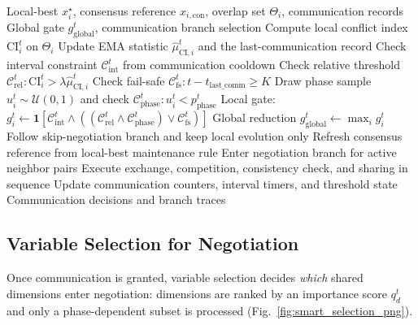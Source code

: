 \documentclass[conference]{IEEEtran}
\begin{document}
\begin{algorithm}[t]
  \footnotesize
  \caption{Conflict-Gated Communication with Phase Sampling (Abstract)}
  \label{alg:ci_gating}
  \begin{algorithmic}[1]
  \Require Local-best $x_i^\star$, consensus reference $x_{i,\mathrm{con}}$, overlap set $\Theta_i$, communication records
  \Ensure Global gate $g_{\mathrm{global}}^t$, communication branch selection
    \State Compute local conflict index $\mathrm{CI}_i^t$ on $\Theta_i$
    \State Update EMA statistic $\hat{\mu}_{\mathrm{CI},i}^t$ and the last-communication record
    \State Check interval constraint $\mathcal{C}_{\mathrm{int}}^t$ from communication cooldown
    \State Check relative threshold $\mathcal{C}_{\mathrm{rel}}^t: \mathrm{CI}_i^t > \lambda\hat{\mu}_{\mathrm{CI},i}^t$
    \State Check fail-safe $\mathcal{C}_{\mathrm{fs}}^t: t-t_{\mathrm{last\_comm}}\ge K$
    \State Draw phase sample $u_i^t\sim\mathcal{U}(0,1)$ and check $\mathcal{C}_{\mathrm{phase}}^t: u_i^t<p_{\mathrm{phase}}^t$
    \State Local gate:
    \Statex \hspace{1.5em}$g_i^t\gets \mathbf{1}\left[\mathcal{C}_{\mathrm{int}}^t\land((\mathcal{C}_{\mathrm{rel}}^t\land \mathcal{C}_{\mathrm{phase}}^t)\lor \mathcal{C}_{\mathrm{fs}}^t)\right]$
    \State Global reduction $g_{\mathrm{global}}^t\gets \max_i g_i^t$
      \State Follow skip-negotiation branch and keep local evolution only
      \State Refresh consensus reference from local-best maintenance rule
    \Else
      \State Enter negotiation branch for active neighbor pairs
      \State Execute exchange, competition, consistency check, and sharing in sequence
    \EndIf
    \State Update communication counters, interval timers, and threshold state
  \EndFor
  \State \Return Communication decisions and branch traces
  \end{algorithmic}
\end{algorithm}

\subsection{Variable Selection for Negotiation}\label{sec:selection}
Once communication is granted, variable selection decides \emph{which} shared dimensions enter negotiation: dimensions are ranked by an importance score $q_d^t$ and only a phase-dependent subset is processed (Fig.~\ref{fig:smart_selection_png}).
\end{document}
